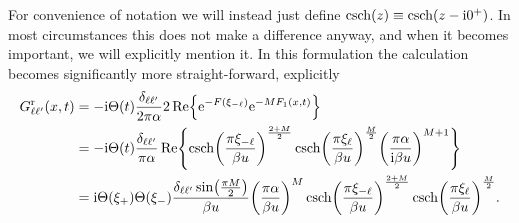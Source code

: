 \documentclass[english, parskip=full]{scrartcl}
\begin{document}
For convenience of notation we will instead just define $\csch(z) \equiv \csch(z - \i 0^+)$.
In most circumstances this does not make a difference anyway, and when it becomes important, we will explicitly mention it.
In this formulation the calculation becomes significantly more straight-forward, explicitly
\begin{align}
G_{\ell\ell'}^\r(x,t) &= -\i\Theta(t) \frac{\delta_{\ell\ell'}}{2\pi\alpha} 2\Re \klc*{\powe{-F(\xi_{-\ell})} \powe{-MF_1(x,t)}}\\
&= -\i\Theta(t) \frac{\delta_{\ell\ell'}}{\pi\alpha} \Re \klc*{ \csch\kla*{\frac{\pi\xi_{-\ell}}{\beta u}}^\frac{2+M}{2} \csch\kla*{\frac{\pi\xi_{\ell}}{\beta u}}^\frac{M}{2} \kla*{\frac{\pi\alpha}{\i \beta u}}^{M+1}}\\
&= \i\Theta(\xi_+) \Theta(\xi_-) \frac{\delta_{\ell\ell'} \sin\kla*{\frac{\pi M}{2}} }{\beta u} \kla*{\frac{\pi\alpha}{\beta u}}^{M} \csch\kla*{\frac{\pi\xi_{-\ell}}{\beta u}}^\frac{2+M}{2} \csch\kla*{\frac{\pi\xi_{\ell}}{\beta u}}^\frac{M}{2}.
\end{align}
\end{document}
